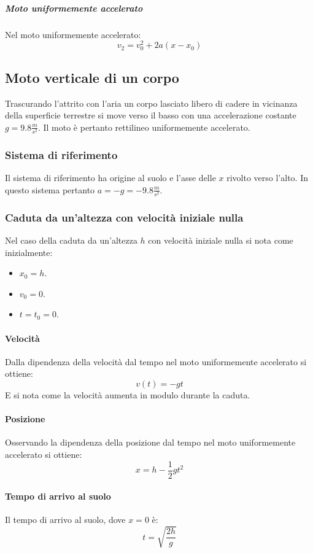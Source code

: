 				\subparagraph{Moto uniformemente accelerato}
				Nel moto uniformemente accelerato:
				$$v_2 = v_0^2 + 2a(x-x_0)$$

	\subsection{Moto verticale di un corpo}
	Trascurando l'attrito con l'aria un corpo lasciato libero di cadere in vicinanza della superficie terrestre si move verso il basso con una accelerazione costante $g=9.8\frac{m}{s^2}$.
	Il moto \`e pertanto rettilineo uniformemente accelerato.

		\subsubsection{Sistema di riferimento}
		Il sistema di riferimento ha origine al suolo e l'asse delle $x$ rivolto verso l'alto.
		In questo sistema pertanto $a=-g=-9.8\frac{m}{s^2}$.

		\subsubsection{Caduta da un'altezza con velocit\`a iniziale nulla}
		Nel caso della caduta da un'altezza $h$ con velocit\`a iniziale nulla si nota come inizialmente:
		\begin{multicols}{3}
			\begin{itemize}
				\item $x_0 = h$.
				\item $v_0 = 0$.
				\item $t = t_0 = 0$.
			\end{itemize}
		\end{multicols}

			\paragraph{Velocit\`a}
			Dalla dipendenza della velocit\`a dal tempo nel moto uniformemente accelerato si ottiene:
			$$v(t) = -gt$$
			E si nota come la velocit\`a aumenta in modulo durante la caduta.

			\paragraph{Posizione}
			Osservando la dipendenza della posizione dal tempo nel moto uniformemente accelerato si ottiene:
			$$x = h -\frac{1}{2}gt^2$$

			\paragraph{Tempo di arrivo al suolo}
			Il tempo di arrivo al suolo, dove $x=0$ \`e:
			$$t = \sqrt{\dfrac{2h}{g}}$$

